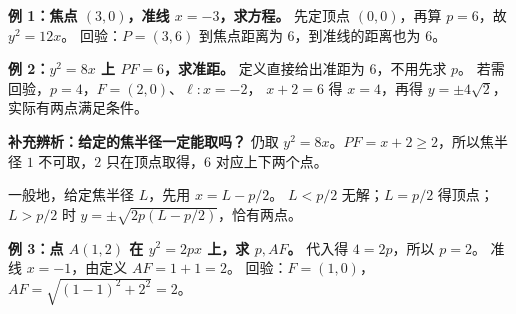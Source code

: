 \begin{examplebox}
\textbf{例 1：焦点 $(3,0)$，准线 $x=-3$，求方程。}
先定顶点 $(0,0)$，再算 $p=6$，故 $\boxed{y^2=12x}$。
回验：$P=(3,6)$ 到焦点距离为 $6$，到准线的距离也为 $6$。

\medskip
\textbf{例 2：$y^2=8x$ 上 $PF=6$，求准距。}
定义直接给出准距为 $\boxed6$，不用先求 $p$。
若需回验，$p=4$，$F=(2,0)$、$\ell:x=-2$，
$x+2=6$ 得 $x=4$，再得 $y=\pm4\sqrt2$，实际有两点满足条件。
\end{examplebox}
\clearpage
\begin{examplebox}
\textbf{补充辨析：给定的焦半径一定能取吗？}
仍取 $y^2=8x$。$PF=x+2\ge2$，所以焦半径 $1$ 不可取，$2$ 只在顶点取得，$6$ 对应上下两个点。

一般地，给定焦半径 $L$，先用 $x=L-p/2$。
$L<p/2$ 无解；$L=p/2$ 得顶点；$L>p/2$ 时
$y=\pm\sqrt{2p(L-p/2)}$，恰有两点。

\medskip
\textbf{例 3：点 $A(1,2)$ 在 $y^2=2px$ 上，求 $p,AF$。}
代入得 $4=2p$，所以 $\boxed{p=2}$。
准线 $x=-1$，由定义 $AF=1+1=\boxed2$。
回验：$F=(1,0)$，$AF=\sqrt{(1-1)^2+2^2}=2$。
\end{examplebox}
\clearpage


